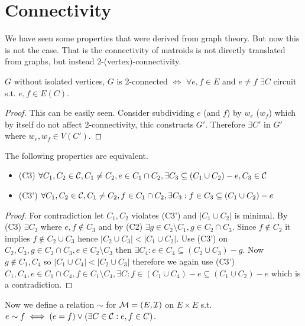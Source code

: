 \chapter{Connectivity}

We have seen some properties that were derived from graph theory. But now this is not the case. That is the connectivity of matroids is not directly translated from graphs, but instead 2-(vertex)-connectivity.

\begin{prop}
	$G$ without isolated vertices, $G$ is 2-connected $\iff$ $\forall e,f \in E$ and $e \neq f$ $\exists C$ circuit s.t. $e,f \in E(C)$.
\end{prop}

\begin{proof}
	This can be easily seen. Consider subdividing $e$ (and $f$) by $w_e$ ($w_f$) which by itself do not affect 2-connectivity, thic constructs $G'$. Therefore $\exists C'$ in $G'$ where $w_e, w_f \in V(C')$.
\end{proof}

\begin{prop}
	The following properties are equivalent.

	\begin{itemize}[]
		\item (C3) $\forall C_1, C_2 \in \mathcal{C}, C_1 \neq C_2, e \in C_1 \cap C_2, \exists C_3 \subseteq (C_1 \cup C_2) -e , C_3 \in \mathcal{C}$
		\item (C3') $\forall C_1, C_2 \in \mathcal{C}, C_1 \neq C_2, f \in C_1 \cap C_2, \exists C_3  : f \in C_3 \subseteq (C_1 \cup C_2) - e$
	\end{itemize}
\end{prop}

\begin{proof}
	For contradiction let $C_1, C_2$ violates (C3') and $|C_1 \cup C_2|$ is minimal. By (C3) $\exists C_3$ where $e,f \notin C_3$ and by (C2) $\exists g \in C_2 \setminus C_1, g \in C_2 \cap C_3$. Since $f \notin C_2$ it implies $f \notin C_2 \cup C_3$ hence $|C_2 \cup C_3| < |C_1 \cup C_2|$. Use (C3') on $C_2, C_3, g \in C_2 \cap C_3, e \in C_2 \setminus C_3$ then $\exists C_4 : e \in C_4 \subseteq (C_2 \cup C_3) - g$. Now $g \notin C_1, C_4$ so $|C_1 \cup C_4| < |C_2 \cup C_3|$ therefore we again use (C3') $C_1, C_4, e \in C_1 \cap C_4, f \in C_1 \setminus C_4, \exists C: f \in (C_1 \cup C_4) - e \subseteq (C_1 \cup C_2) - e$ which is a contradiction.
\end{proof}

Now we define a relation $\sim$ for $\mathcal{M} = (E, \mathcal{I})$ on $E \times E$ s.t. $e \sim f \iff (e = f) \lor (\exists C \in \mathcal{C} : e,f \in C)$.

